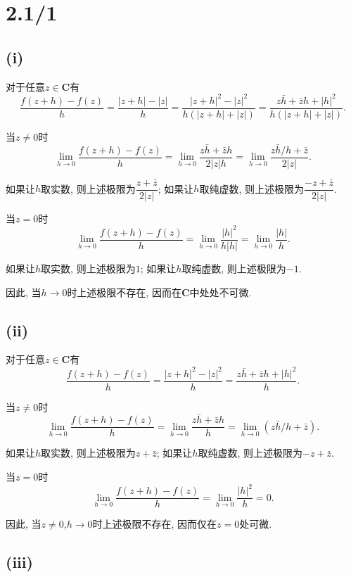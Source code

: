 \documentclass[11pt,a4paper]{article}
\author{刘逸灏 (515370910207)}
\begin{document}
\maketitle

\section{2.1/1}

\subsection*{(i)}

对于任意$z\in\mathbf{C}$有
$$\frac{f(z+h)-f(z)}{h}=\frac{|z+h|-|z|}{h}=\frac{|z+h|^2-|z|^2}{h(|z+h|+|z|)}=\frac{z\bar{h}+\bar{z}h+|h|^2}{h(|z+h|+|z|)}.$$

当$z\neq0$时
$$\lim_{h\to0}\frac{f(z+h)-f(z)}{h}=\lim_{h\to0}\frac{z\bar{h}+\bar{z}h}{2|z|h}=\lim_{h\to0}\frac{z\bar{h}/h+\bar{z}}{2|z|}.$$

如果让$h$取实数, 则上述极限为$\dfrac{z+\bar{z}}{2|z|}$; 如果让$h$取纯虚数, 则上述极限为$\dfrac{-z+\bar{z}}{2|z|}$.

当$z=0$时
$$\lim_{h\to0}\frac{f(z+h)-f(z)}{h}=\lim_{h\to0}\frac{|h|^2}{h|h|}=\lim_{h\to0}\frac{|h|}{h}.$$

如果让$h$取实数, 则上述极限为$1$; 如果让$h$取纯虚数, 则上述极限为$-1$.

因此, 当$h\to0$时上述极限不存在, 因而在$\mathbf{C}$中处处不可微.

\subsection*{(ii)}

对于任意$z\in\mathbf{C}$有
$$\frac{f(z+h)-f(z)}{h}=\frac{|z+h|^2-|z|^2}{h}=\frac{z\bar{h}+\bar{z}h+|h|^2}{h}.$$

当$z\neq0$时
$$\lim_{h\to0}\frac{f(z+h)-f(z)}{h}=\lim_{h\to0}\frac{z\bar{h}+\bar{z}h}{h}=\lim_{h\to0}(z\bar{h}/h+\bar{z}).$$

如果让$h$取实数, 则上述极限为$z+\bar{z}$; 如果让$h$取纯虚数, 则上述极限为$-z+\bar{z}$.

当$z=0$时
$$\lim_{h\to0}\frac{f(z+h)-f(z)}{h}=\lim_{h\to0}\frac{|h|^2}{h}=0.$$

因此, 当$z\neq0$,$h\to0$时上述极限不存在, 因而仅在$z=0$处可微.

\subsection*{(iii)}
\end{document}
